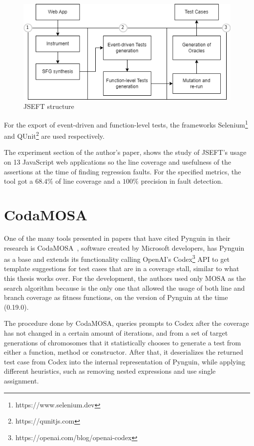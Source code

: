 \documentclass[%
  chapterprefix=false,%
  open=right,%
  twoside=true,%
  paper=a4,%
  logofile={Figures/logo.png},%
  thesistype=master,%
  UKenglish,%
]{se2thesis}
\begin{document}
\begin{figure}[tb]
  \centering 
  \includegraphics[width=.99\textwidth]{Figures/jseft2.png}
  \caption{JSEFT structure}\label{fig:jseft}
\end{figure}

For the export of event-driven and function-level tests, the frameworks Selenium\footnote{https://www.selenium.dev} and QUnit\footnote{https://qunitjs.com} are used respectively.

The experiment section of the author's paper, shows the study of JSEFT's usage on 13 JavaScript web applications so the line coverage and usefulness of the assertions at the time of finding regression faults.
For the specified metrics, the tool got a \(68.4\%\) of line coverage and a \(100\%\) precision in fault detection.


\section{CodaMOSA}

One of the many tools presented in papers that have cited Pynguin in their research is CodaMOSA~\cite{DBLP:conf/icse/LemieuxILS23}, software created by Microsoft developers, has Pynguin as a base and extends its functionality calling OpenAI's Codex\footnote{https://openai.com/blog/openai-codex} API to get template suggestions for test cases that are in a coverage stall, similar to what this thesis works over.
For the development, the authors used only MOSA as the search algorithm because is the only one that allowed the usage of both line and branch coverage as fitness functions, on the version of Pynguin at the time (0.19.0).

The procedure done by CodaMOSA, queries prompts to Codex after the coverage has not changed in a certain amount of iterations, and from a set of target generations of chromosomes that it statistically chooses to generate a test from either a function, method or constructor.
After that, it deserializes the returned test case from Codex into the internal representation of Pynguin, while applying different heuristics, such as removing nested expressions and use single assignment.
\end{document}
